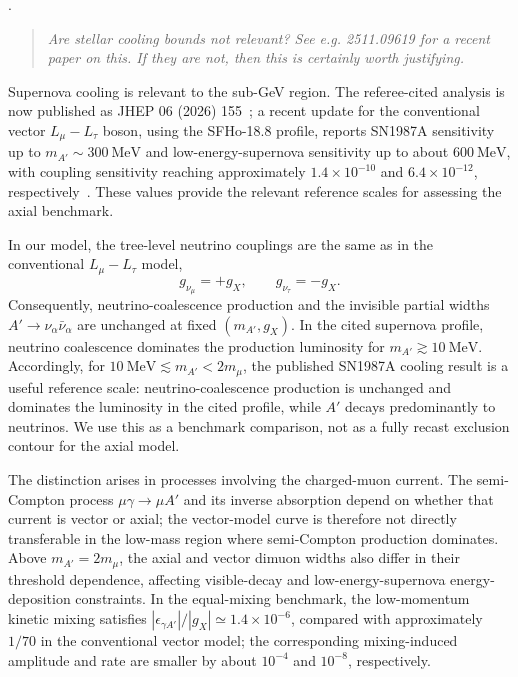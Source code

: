 \documentclass[12pt,a4paper]{article}
\begin{document}
.
\begin{quote}\itshape
Are stellar cooling bounds not relevant? See e.g. 2511.09619 for a recent paper on this. If they are not, then this is certainly worth justifying.
\end{quote}


Supernova cooling is relevant to the sub-GeV region. The referee-cited analysis is now published as JHEP 06 (2026) 155~\cite{Blinov:2025aha}; a recent update for the conventional vector \(L_\mu-L_\tau\) boson, using the SFHo-18.8 profile, reports SN1987A sensitivity up to \(m_{A'}\sim300~\mathrm{MeV}\) and low-energy-supernova sensitivity up to about \(600~\mathrm{MeV}\), with coupling sensitivity reaching approximately \(1.4\times10^{-10}\) and \(6.4\times10^{-12}\), respectively~\cite{Wang:2026supernova}. These values provide the relevant reference scales for assessing the axial benchmark.

In our model, the tree-level neutrino couplings are the same as in the conventional \(L_\mu-L_\tau\) model,
\[
g_{\nu_\mu}=+g_X,\qquad g_{\nu_\tau}=-g_X.
\]
Consequently, neutrino-coalescence production and the invisible partial widths \(A'\to\nu_\alpha\bar\nu_\alpha\) are unchanged at fixed \((m_{A'},g_X)\). In the cited supernova profile, neutrino coalescence dominates the production luminosity for \(m_{A'}\gtrsim10~\mathrm{MeV}\). Accordingly, for \(10~\mathrm{MeV}\lesssim m_{A'}<2m_\mu\), the published SN1987A cooling result is a useful reference scale: neutrino-coalescence production is unchanged and dominates the luminosity in the cited profile, while \(A'\) decays predominantly to neutrinos. We use this as a benchmark comparison, not as a fully recast exclusion contour for the axial model.

The distinction arises in processes involving the charged-muon current. The semi-Compton process \(\mu\gamma\to\mu A'\) and its inverse absorption depend on whether that current is vector or axial; the vector-model curve is therefore not directly transferable in the low-mass region where semi-Compton production dominates. Above \(m_{A'}=2m_\mu\), the axial and vector dimuon widths also differ in their threshold dependence, affecting visible-decay and low-energy-supernova energy-deposition constraints. In the equal-mixing benchmark, the low-momentum kinetic mixing satisfies \(|\epsilon_{\gamma A'}|/|g_X|\simeq1.4\times10^{-6}\), compared with approximately \(1/70\) in the conventional vector model; the corresponding mixing-induced amplitude and rate are smaller by about \(10^{-4}\) and \(10^{-8}\), respectively.
\end{document}
